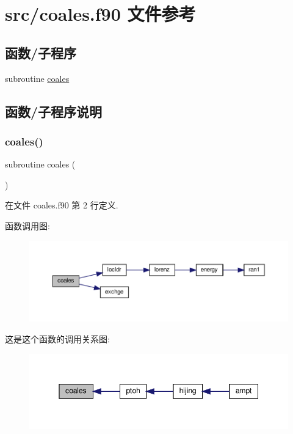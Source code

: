 \hypertarget{coales_8f90}{}\section{src/coales.f90 文件参考}
\label{coales_8f90}
\subsection*{函数/子程序}
\begin{DoxyCompactItemize}
\item 
subroutine \mbox{\hyperlink{coales_8f90_ac9ac1fa1da3e46c9e24c4a3953971000}{coales}}
\end{DoxyCompactItemize}


\subsection{函数/子程序说明}
\mbox{\label{coales_8f90_ac9ac1fa1da3e46c9e24c4a3953971000}} 
\subsubsection{\texorpdfstring{coales()}{coales()}}
{\footnotesize\ttfamily subroutine coales (\begin{DoxyParamCaption}{ }\end{DoxyParamCaption})}



在文件 coales.\+f90 第 2 行定义.

函数调用图\+:
\nopagebreak
\begin{figure}[H]
\begin{center}
\leavevmode
\includegraphics[width=350pt]{coales_8f90_ac9ac1fa1da3e46c9e24c4a3953971000_cgraph}
\end{center}
\end{figure}
这是这个函数的调用关系图\+:
\nopagebreak
\begin{figure}[H]
\begin{center}
\leavevmode
\includegraphics[width=345pt]{coales_8f90_ac9ac1fa1da3e46c9e24c4a3953971000_icgraph}
\end{center}
\end{figure}
